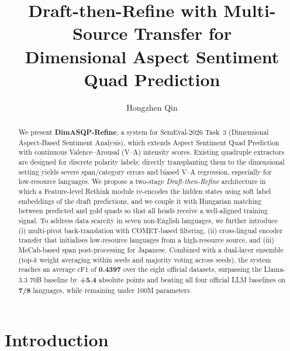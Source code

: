 \documentclass[runningheads]{llncs}
\begin{document}
\title{Draft-then-Refine with Multi-Source Transfer for\\
Dimensional Aspect Sentiment Quad Prediction}

\author{Hongzhen Qin}

\maketitle

\begin{abstract}
We present \textbf{DimASQP-Refine}, a system for SemEval-2026 Task~3
(Dimensional Aspect-Based Sentiment Analysis), which extends Aspect
Sentiment Quad Prediction with continuous Valence--Arousal (V--A)
intensity scores. Existing quadruple extractors are designed for
discrete polarity labels; directly transplanting them to the dimensional
setting yields severe span/category errors and biased V--A regression,
especially for low-resource languages. We propose a two-stage
\emph{Draft-then-Refine} architecture in which a Feature-level Rethink
module re-encodes the hidden states using soft label embeddings of the
draft predictions, and we couple it with Hungarian matching between
predicted and gold quads so that all heads receive a well-aligned
training signal. To address data scarcity in seven non-English
languages, we further introduce (i) multi-pivot back-translation with
COMET-based filtering, (ii) cross-lingual encoder transfer that
initialises low-resource languages from a high-resource source, and
(iii) MeCab-based span post-processing for Japanese. Combined with a
dual-layer ensemble (top-$k$ weight averaging within seeds and majority
voting across seeds), the system reaches an average $\mathrm{cF1}$ of
\textbf{0.4397} over the eight official datasets, surpassing the
Llama-3.3 70B baseline by \textbf{+5.4} absolute points and beating all
four official LLM baselines on \textbf{7/8} languages, while remaining
under 100M parameters.

\end{abstract}

\section{Introduction}
\label{sec:intro}
\end{document}

